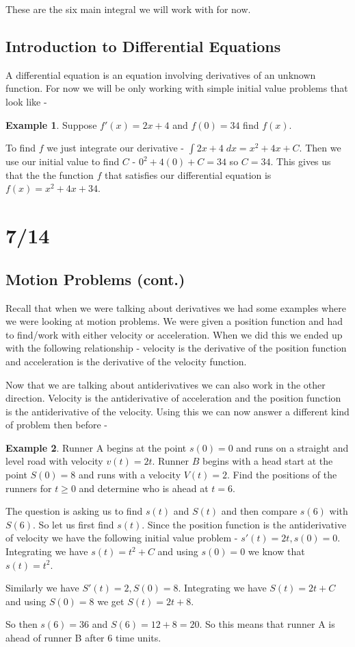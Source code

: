 \documentclass[12pt,reqno]{article}
\theoremstyle{definition}
\newtheorem*{Example}{Example}
\begin{document}
These are the six main integral we will work with for now. 

\subsection{Introduction to Differential Equations} 

A differential equation is an equation involving derivatives of an unknown function. For now we will be only working with simple initial value problems that look like - 
\begin{Example} 
	Suppose $f'(x) = 2x + 4$ and $f(0) = 34$ find $f(x)$. 
	
	To find $f$ we just integrate our derivative - $\int 2x + 4 \; dx = x^2 + 4x + C$. Then we use our initial value to find $C$ - $0^2 + 4(0) + C = 34$ so $C = 34$. This gives us that the the function $f$ that satisfies our differential equation is $f(x) = x^2 + 4x + 34$. 
\end{Example} 

\section{7/14} 
\subsection{Motion Problems (cont.)} 

Recall that when we were talking about derivatives we had some examples where we were looking at motion problems. We were given a position function and had to find/work with either velocity or acceleration. When we did this we ended up with the following relationship - velocity is the derivative of the position function and acceleration is the derivative of the velocity function. 

Now that we are talking about antiderivatives we can also work in the other direction. Velocity is the antiderivative of acceleration and the position function is the antiderivative of the velocity. Using this we can now answer a different kind of problem then before - 
\begin{Example} 
	Runner A begins at the point $s(0) = 0$ and runs on a straight and level road with velocity $v(t) = 2t$. Runner $B$ begins with a head start at the point $S(0) = 8$ and runs with a velocity $V(t) = 2$. Find the positions of the runners for $t \geq 0$ and determine who is ahead at $t = 6$. 
	
	The question is asking us to find $s(t)$ and $S(t)$ and then compare $s(6)$ with $S(6)$. So let us first find $s(t)$. Since the position function is the antiderivative of velocity we have the following initial value problem - $s'(t) = 2t, s(0) = 0$. Integrating we have $s(t) = t^2 + C$ and using $s(0) = 0$ we know that $s(t) = t^2$. 
	
	Similarly we have $S'(t) = 2, S(0) = 8$. Integrating we have $S(t) = 2t + C$ and using $S(0) = 8$ we get $S(t) = 2t + 8$. 
	
	So then $s(6) = 36$ and $S(6)  = 12 + 8 = 20$. So this means that runner A is ahead of runner B after 6 time units. 
\end{Example}
\end{document}
